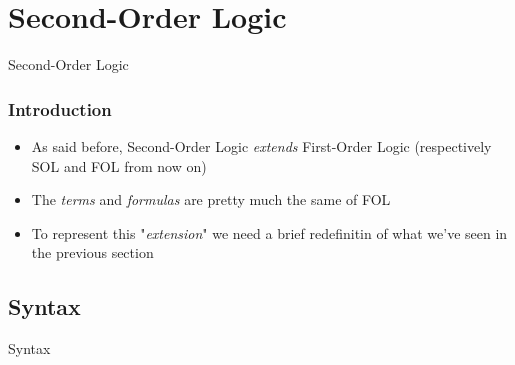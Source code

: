 \documentclass{beamer}
\begin{document}
        \section{Second-Order Logic}
            \begin{frame}
                \begin{center}
                    \begin{Huge}
                        \textcolor{title_blue}{Second-Order Logic}
                    \end{Huge}
                \end{center}
            \end{frame}

            \begin{frame}
                \frametitle{Introduction}
                \begin{itemize}
                    \item As said before, Second-Order Logic \textit{extends} First-Order Logic (respectively SOL and FOL from now on)
                    \item The \textit{terms} and \textit{formulas} are pretty much the same of FOL
                    \item To represent this "\textit{extension}" we need a brief redefinitin of what we've seen in the previous section
                \end{itemize}
            \end{frame}

            \subsection{Syntax}
                \begin{frame}
                    \begin{center}
                        \begin{Huge}
                            \textcolor{title_blue}{Syntax}
                        \end{Huge}
                    \end{center}
                \end{frame}
\end{document}

